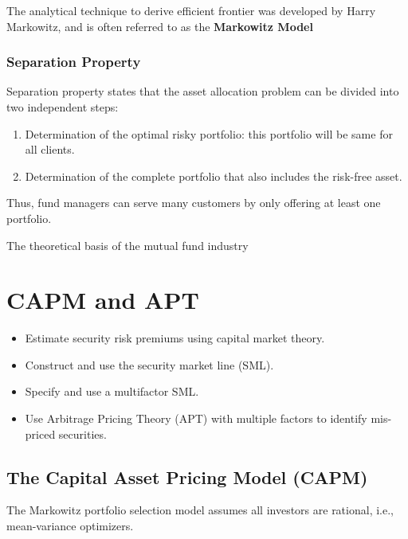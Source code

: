\documentclass[
]{book}
\providecommand{\tightlist}{%
  \setlength{\itemsep}{0pt}\setlength{\parskip}{0pt}}
\begin{document}
The analytical technique to derive efficient frontier was developed by
Harry Markowitz, and is often referred to as the \textbf{Markowitz
Model}

\hypertarget{separation-property}{%
\subsection{Separation Property}\label{separation-property}}

Separation property states that the asset allocation problem can be
divided into two independent steps:

\begin{enumerate}
\def\labelenumi{\arabic{enumi}.}
\item
  Determination of the optimal risky portfolio: this portfolio will be
  same for all clients.
\item
  Determination of the complete portfolio that also includes the
  risk-free asset.
\end{enumerate}

Thus, fund managers can serve many customers by only offering at least
one portfolio.

The theoretical basis of the mutual fund industry

\hypertarget{ch4}{%
\chapter{CAPM and APT}\label{ch4}}

\begin{itemize}
\tightlist
\item
  Estimate security risk premiums using capital market theory.
\item
  Construct and use the security market line (SML).
\item
  Specify and use a multifactor SML.
\item
  Use Arbitrage Pricing Theory (APT) with multiple factors to identify
  mis-priced securities.
\end{itemize}

\hypertarget{the-capital-asset-pricing-model-capm}{%
\section{The Capital Asset Pricing Model
(CAPM)}\label{the-capital-asset-pricing-model-capm}}

The Markowitz portfolio selection model assumes all investors are
rational, i.e., mean-variance optimizers.
\end{document}
